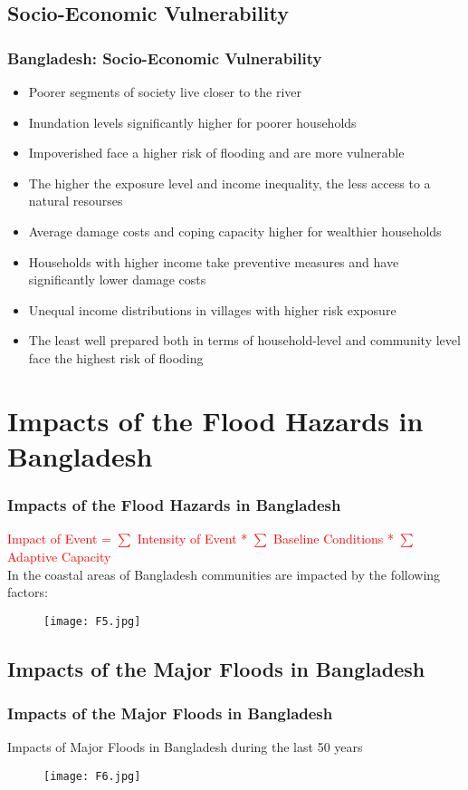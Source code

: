 \documentclass[pdflatex,compress,8pt,
	xcolor={dvipsnames,dvipsnames,svgnames,x11names,table},
	hyperref={colorlinks = true,breaklinks = true, urlcolor = NavyBlue, breaklinks = true}]{beamer}
\begin{document}
\subsection{Socio-Economic Vulnerability}
\begin{frame}\frametitle{Bangladesh: Socio-Economic Vulnerability}
\begin{itemize}
	\item Poorer segments of society live closer to the river
	\item Inundation levels significantly higher for poorer households
	\item Impoverished face a higher risk of flooding and are more vulnerable
	\item The higher the exposure level and income inequality, the less access to a natural resourses
	\item Average damage costs and coping capacity higher for wealthier households
	\item Households with higher income take preventive measures and have significantly lower damage costs
	\item Unequal income distributions in villages with higher risk exposure
	\item The least well prepared both in terms of household-level and community level face the highest risk of flooding
\end{itemize}
\end{frame}

\section{Impacts of the Flood Hazards in Bangladesh}
\begin{frame}\frametitle{Impacts of the Flood Hazards in Bangladesh}
\small{\textcolor{red}{Impact of Event = $\sum$ Intensity of Event * $\sum$ Baseline Conditions * $\sum$ Adaptive Capacity}}\\
In the coastal areas of Bangladesh communities are impacted by the following factors:
\begin{figure}[H]
	\centering
		\texttt{[image: F5.jpg]}
\end{figure}
\end{frame}

\subsection{Impacts of the Major Floods in Bangladesh}
\begin{frame}\frametitle{Impacts of the Major Floods in Bangladesh}
Impacts of Major Floods in Bangladesh during the last 50 years
\begin{figure}[H]
	\centering
		\texttt{[image: F6.jpg]}
\end{figure}
\end{frame}
\end{document}
